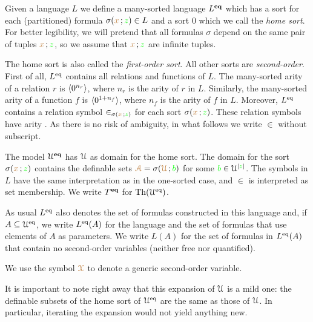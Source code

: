 \documentclass[creche.tex]{subfiles}
\begin{document}
Given a language $L$ we define a many-sorted language \emph{$L^{\rm\textbf{eq}}$\/} which has a sort for each (partitioned) formula $\sigma({\color{brown} x}\,;{\color{green} z})\in L$ and a sort \emph{$0$\/} which we call the \emph{home sort}. For better legibility, we will pretend that all formulas $\sigma$ depend on the same pair of tuples ${\color{brown} x}\,;{\color{green} z}$, so we assume that ${\color{brown} x}\,;{\color{green} z}$ are infinite tuples. 

The home sort is also called the \emph{first-order sort}. All other sorts are \emph{second-order}. First of all, $L^{{\rm eq}}$ contains all relations and functions of $L$. The many-sorted arity of a relation $r$ is $\langle0^{n_r}\rangle$, where $n_r$ is the arity of $r$ in $L$. Similarly, the many-sorted arity of a function $f$ is $\langle0^{1+n_f}\rangle$, where $n_f$ is the arity of $f$ in $L$. Moreover, $L^{{\rm eq}}$ contains a relation symbol $\in_{\sigma({\color{brown} x}\,;{\color{green} z})}$ for each sort $\sigma({\color{brown} x}\,;{\color{green} z})$. These relation symbols have arity . As there is no risk of ambiguity, in what follows we write $\in$ without subscript.

The model \emph{$\EuScript U^{\rm\textbf{eq}}$\/} has $\EuScript U$ as domain for the home sort. The domain for the sort $\sigma({\color{brown} x}\,;{\color{green} z})$ contains the definable sets ${\color{brown}\EuScript A}=\sigma({\color{brown}\EuScript U}\,;{\color{green} b})$ for some ${\color{green} b}\in\EuScript U^{|{\color{green} z}|}$. The symbols in $L$ have the same interpretation as in the one-sorted case, and $\in$ is interpreted as set membership. We write \emph{$T^{\rm\textbf{eq}}$\/} for $\textrm{Th}(\EuScript U^{{\rm eq}})$.

As usual \emph{$L^{{\rm eq}}$\/} also denotes the set of formulas constructed in this language and, if $A\subseteq\EuScript U^{{\rm eq}}$, we write  \emph{$L^{{\rm eq}}(A)$\/} for the language and the set of formulas that use elements of $A$ as parameters. We write \emph{$L(A)$\/} for the set of formulas in $L^{{\rm eq}}(A)$ that contain no second-order variables (neither free nor quantified).  

We use the symbol ${\color{brown}\EuScript X}$ to denote a generic second-order variable.


It is important to note right away that this expansion of $\EuScript U$ is a mild one: the definable subsets of the home sort of $\EuScript U^{{\rm eq}}$ are the same as those of $\EuScript U$. In particular, iterating the expansion would not yield anything new. 
\end{document}
